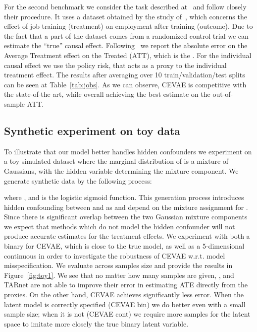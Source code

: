 \documentclass{article}
\begin{document}
For the second benchmark we consider the task described at~\cite{shalit2016estimating} and follow closely their procedure. It uses a dataset obtained by the study of~\cite{lalonde1986evaluating,smith2005does}, which concerns the effect of job training (treatment) on employment after training (outcome). Due to the fact that a part of the dataset comes from a randomized control trial we can estimate the ``true'' causal effect. Following~\cite{shalit2016estimating} we report the absolute error on the Average Treatment effect on the Treated (ATT), which is the . For the individual causal effect we use the policy risk, that acts as a proxy to the individual treatment effect. The results after averaging over 10 train/validation/test splits can be seen at Table~\ref{tab:jobs}. As we can observe, CEVAE is competitive with the state-of-the art, while overall achieving the best estimate on the out-of-sample ATT.


\subsection{Synthetic experiment on toy data}

To illustrate that our model better handles hidden confounders we experiment on a toy simulated dataset where the marginal distribution of  is a mixture of Gaussians, with the hidden variable  determining the mixture component. We generate synthetic data by the following process:

where ,  and  is the logistic sigmoid function. This generation process introduces hidden confounding between  and  as  and  depend on the mixture assignment  for . Since there is significant overlap between the two Gaussian mixture components we expect that methods which do not model the hidden confounder  will not produce accurate estimates for the treatment effects. We experiment with both a binary  for CEVAE, which is close to the true model, as well as a 5-dimensional continuous  in order to investigate the robustness of CEVAE w.r.t. model misspecification. We evaluate across samples size  and provide the results in Figure~\ref{fig:toy1}.  We see that no matter how many samples are given, ,  and TARnet are not able to improve their error in estimating ATE directly from the proxies. On the other hand, CEVAE achieves significantly less error. When the latent model is correctly specified (CEVAE bin) we do better even with a small sample size; when it is not (CEVAE cont) we require more samples for the latent space to imitate more closely the true binary latent variable.
\end{document}
